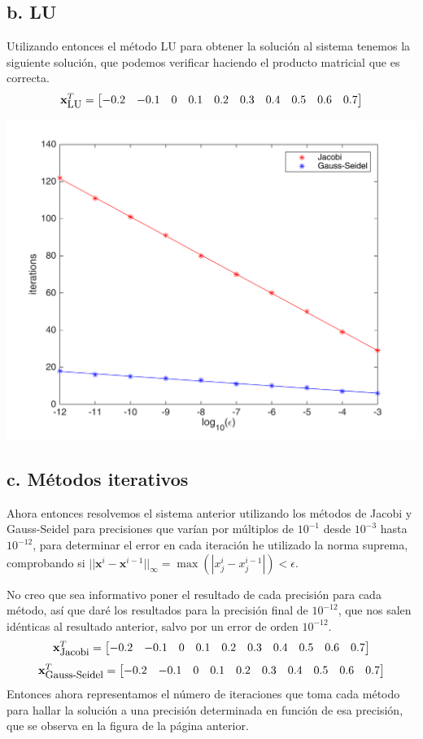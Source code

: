 \documentclass{article}
\begin{document}
\subsection*{b. LU}
Utilizando entonces el método LU para obtener la solución al sistema tenemos la siguiente solución, que podemos verificar haciendo el producto matricial que es correcta.
\[\mathbf{x}_{\mbox{\small LU}}^T = \left[\begin{matrix}
	-0.2 & -0.1 & 0 & 0.1 & 0.2 & 0.3 & 0.4 & 0.5 & 0.6 & 0.7
\end{matrix}\right]\]

\includegraphics{untitled2.png}

\subsection*{c. Métodos iterativos}
Ahora entonces resolvemos el sistema anterior utilizando los métodos de Jacobi y Gauss-Seidel para precisiones que varían por múltiplos de $10^{-1}$ desde $10^{-3}$ hasta $10^{-12}$, para determinar el error en cada iteración he utilizado la norma suprema, comprobando si $||\mathbf{x}^i-\mathbf{x}^{i-1}||_\infty = \max\left(|x_j^i-x_j^{i-1}|\right) < \epsilon$.

No creo que sea informativo poner el resultado de cada precisión para cada método, así que daré los resultados para la precisión final de $10^{-12}$, que nos salen idénticas al resultado anterior, salvo por un error de orden $10^{-12}$.
\[\mathbf{x}_{\mbox{\small Jacobi}}^T = \left[\begin{matrix}
	-0.2 & -0.1 & 0 & 0.1 & 0.2 & 0.3 & 0.4 & 0.5 & 0.6 & 0.7
\end{matrix}\right]\]
\[\mathbf{x}_{\mbox{\small Gauss-Seidel}}^T = \left[\begin{matrix}
	-0.2 & -0.1 & 0 & 0.1 & 0.2 & 0.3 & 0.4 & 0.5 & 0.6 & 0.7
\end{matrix}\right]\]
Entonces ahora representamos el número de iteraciones que toma cada método para hallar la solución a una precisión determinada en función de esa precisión, que se observa en la figura de la página anterior.
\end{document}
